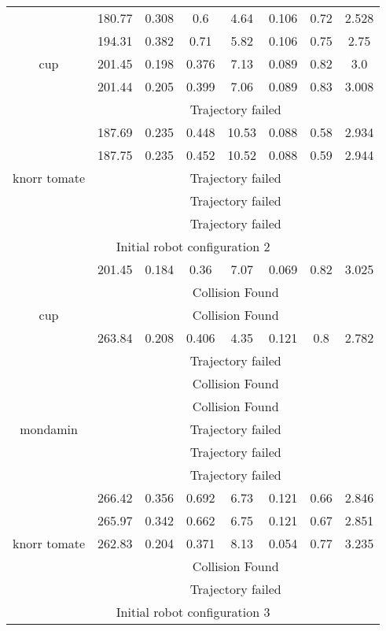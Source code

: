 {\begin{center}
\begin{longtable}[c]{ | c | c | c | c | c | c | c || c || }
\hline
\multirow{5}{1.5cm}{cup}& 180.77 & 0.308 & 0.6 & 4.64 & 0.106 & 0.72 & 2.528 \\
& 194.31 & 0.382 & 0.71 & 5.82 & 0.106 & 0.75 & 2.75 \\
& 201.45 & 0.198 & 0.376 & 7.13 & 0.089 & 0.82 & 3.0 \\
& 201.44 & 0.205 & 0.399 & 7.06 & 0.089 & 0.83 & 3.008 \\
& \multicolumn{7}{c|}{Trajectory failed} \\
\hline 
\multirow{5}{1.5cm}{knorr tomate}& 187.69 & 0.235 & 0.448 & 10.53 & 0.088 & 0.58 & 2.934 \\
& 187.75 & 0.235 & 0.452 & 10.52 & 0.088 & 0.59 & 2.944 \\
& \multicolumn{7}{c|}{Trajectory failed} \\
& \multicolumn{7}{c|}{Trajectory failed} \\
& \multicolumn{7}{c|}{Trajectory failed} \\
\hline 
\multicolumn{8}{|c|}{Initial robot configuration 2} \\
\hline
\multirow{5}{1.5cm}{cup}& 201.45 & 0.184 & 0.36 & 7.07 & 0.069 & 0.82 & 3.025 \\
& \multicolumn{7}{c|}{Collision Found} \\
& \multicolumn{7}{c|}{Collision Found} \\
& 263.84 & 0.208 & 0.406 & 4.35 & 0.121 & 0.8 & 2.782 \\
& \multicolumn{7}{c|}{Trajectory failed} \\
\hline 
\multirow{5}{1.5cm}{mondamin}& \multicolumn{7}{c|}{Collision Found} \\
& \multicolumn{7}{c|}{Collision Found} \\
& \multicolumn{7}{c|}{Trajectory failed} \\
& \multicolumn{7}{c|}{Trajectory failed} \\
& \multicolumn{7}{c|}{Trajectory failed} \\
\hline 
\multirow{5}{1.5cm}{knorr tomate}& 266.42 & 0.356 & 0.692 & 6.73 & 0.121 & 0.66 & 2.846 \\
& 265.97 & 0.342 & 0.662 & 6.75 & 0.121 & 0.67 & 2.851 \\
& 262.83 & 0.204 & 0.371 & 8.13 & 0.054 & 0.77 & 3.235 \\
& \multicolumn{7}{c|}{Collision Found} \\
& \multicolumn{7}{c|}{Trajectory failed} \\
\hline 
\multicolumn{8}{|c|}{Initial robot configuration 3} \\

\end{longtable}
\end{center}}
